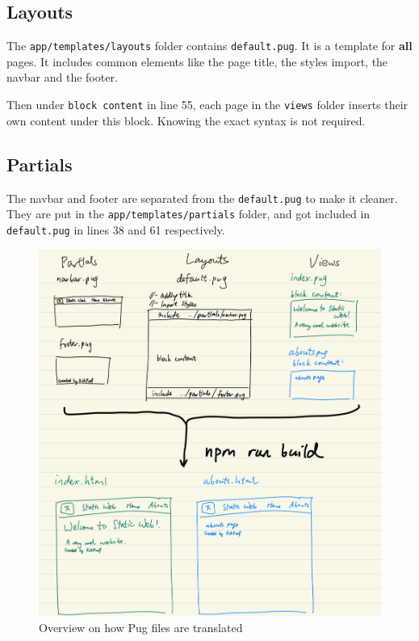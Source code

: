 \subsection*{Layouts}

The \texttt{app/templates/layouts} folder contains \texttt{default.pug}. It is a template for \textbf{all} pages. It includes common elements like the page title, the styles import, the navbar and the footer. 

Then under \texttt{block content} in line 55, each page in the \texttt{views} folder inserts their own content under this block. Knowing the exact syntax is not required.

\subsection*{Partials}

The navbar and footer are separated from the \texttt{default.pug} to make it cleaner. They are put in the \texttt{app/templates/partials} folder, and got included in \texttt{default.pug} in lines 38 and 61 respectively.

\begin{figure}[h]
\centering
\includegraphics[width=13cm]{images/ch4-puglayouts.png}
\caption{Overview on how Pug files are translated}
\end{figure}

